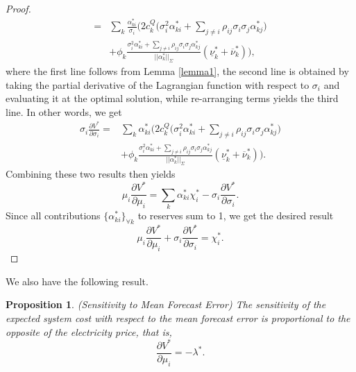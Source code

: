 \documentclass{article}
\newtheorem{proposition}{Proposition}
\begin{document}
\begin{proof}
\begin{align*}
=&\sum_k\frac{\alpha_{ki}^*}{\sigma_i}\Big(2c_k^Q\big(\sigma_i^2 \alpha_{ki}^* + \sum_{j \ne i} \rho_{ij} \sigma_i \sigma_j\alpha_{kj}^*\big)\\
&+ \phi_k \frac{\sigma_i^2 \alpha_{ki}^* + \sum_{j \ne i} \rho_{ij} \sigma_i \sigma_j \alpha_{kj}^*}{||\alpha_k^*||_{\Sigma}}(\underline{\nu}_k^* + \overline{\nu}_k^*)\Big),
\end{align*}
where the first line follows from Lemma \ref{lemma1}, the second line is obtained by taking the partial derivative of the Lagrangian function with respect to $\sigma_i$ and evaluating it at the optimal solution, while re-arranging terms yields the third line. In other words, we get
\begin{align*}
\sigma_i \frac{\partial V^*}{\partial \sigma_i} =& \sum_k \alpha_{ki}^*\Big(2c_k^Q\big(\sigma_i^2 \alpha_{ki}^* + \sum_{j \ne i} \rho_{ij} \sigma_i \sigma_j\alpha_{kj}^*\big)\\
&+ \phi_k \frac{\sigma_i^2 \alpha_{ki}^* + \sum_{j \ne i} \rho_{ij} \sigma_i \sigma_j \alpha_{kj}^*}{||\alpha_k^*||_{\Sigma}}(\underline{\nu}_k^* + \overline{\nu}_k^*)\Big).
\end{align*}
Combining these two results then yields
\begin{equation*}
\mu_i \frac{\partial V^*}{\partial \mu_i} = \sum_k\alpha_{ki}^* \chi_i^* - \sigma_i \frac{\partial V^*}{\partial \sigma_i}.
\end{equation*}
Since all contributions $\{\alpha_{ki}^*\}_{\forall k}$ to reserves sum to 1, we get the desired result
\begin{equation*}
\mu_i \frac{\partial V^*}{\partial \mu_i} + \sigma_i \frac{\partial V^*}{\partial \sigma_i} = \chi_i^*.
\end{equation*}
\end{proof}
We also have the following result.
\begin{proposition}\label{SensitivityMeanElectricityPrice}
(Sensitivity to Mean Forecast Error) The sensitivity of the expected system cost with respect to the mean forecast error is proportional to the opposite of the electricity price, that is,
\begin{equation*}
\frac{\partial V^*}{\partial \mu_i} = -\lambda^*.
\end{equation*}
\end{proposition}
\end{document}
